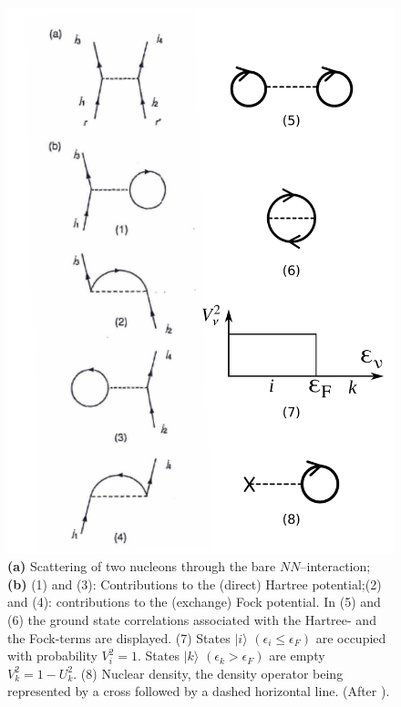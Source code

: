 \documentclass[a4paper,11pt]{book}
\numberwithin{equation}{section}
\numberwithin{figure}{section}
\numberwithin{table}{section}
\newcommand{\ket}[1]{|{#1} \rangle }
\begin{document}
\begin{figure}
	\centerline {
		\includegraphics*[width=12cm]{introduccion/figs/figpreface6}
	}
	\caption{\textbf{(a)} Scattering of two nucleons through the bare $NN$--interaction; \textbf{(b)} (1) and (3): Contributions to the (direct) Hartree potential;(2) and (4): contributions to the (exchange) Fock potential. In (5) and (6) the ground state correlations associated with the Hartree- and the Fock-terms are displayed. (7) States $\ket{i}$ $(\epsilon_i\leq\epsilon_F)$ are occupied with probability $V^2_i=1$. States $\ket{k}$ $(\epsilon_k>\epsilon_F)$ are empty $V^2_k=1-U^2_k$. (8) Nuclear density, the density operator being represented by a cross followed by a dashed horizontal line. (After \cite{Brink:05}).}
	\label{fig1.0.6}
\end{figure}
\end{document}
